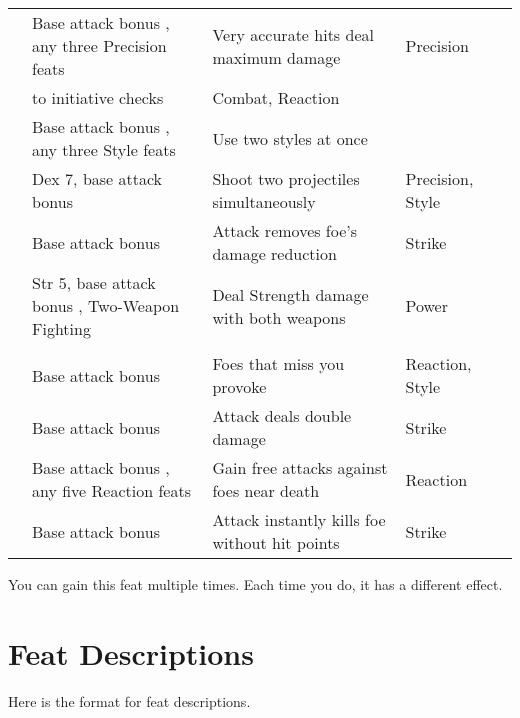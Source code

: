 {\begin{longtabu}{>{\lcol}p{10em} >{\lcol}p{15em} >{\lcol}X >{\lcol}p{6em} >{\lcol}p{3em}}
 & Base attack bonus , any three Precision feats & Very accurate hits deal maximum damage & Precision &  \\
 &  to initiative checks & Combat, Reaction &  \\
 & Base attack bonus , any three Style feats & Use two styles at once & \x &  \\
 & Dex 7, base attack bonus  & Shoot two projectiles simultaneously & Precision, Style &  \\
 & Base attack bonus  & Attack removes foe's damage reduction & Strike &  \\
 & Str 5, base attack bonus , Two-Weapon Fighting & Deal Strength damage with both weapons & Power &  \\

\midrule
{} &  &  &  &  \\
 & Base attack bonus  & Foes that miss you provoke & Reaction, Style&  \\
 & Base attack bonus  & Attack deals double damage & Strike &  \\
 & Base attack bonus , any five Reaction feats & Gain free attacks against foes near death & Reaction &  \\
 & Base attack bonus  & Attack instantly kills foe without hit points & Strike &  \\
\end{longtabu}
\begin{enumerate*}
    \item You can gain this feat multiple times. Each time you do, it has a different effect.
\end{enumerate*}
}%

\twocolumn

\section{Feat Descriptions}
Here is the format for feat descriptions.

